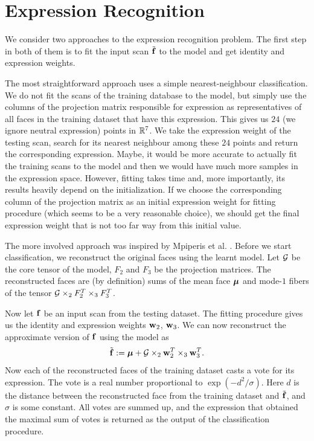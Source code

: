 
\section{Expression Recognition}


We consider two approaches to the expression recognition problem.
The first step in both of them is
to fit the input scan ${\tilde{\mathbf{f}}}$ to the model and get identity 
and expression weights.  

The most straightforward approach uses a simple nearest-neighbour classification.
We do not fit the scans of the training database to the model, but simply use
the columns of the projection matrix responsible for expression as representatives
of all faces in the training dataset that have this expression. This gives us $24$ (we ignore neutral
expression)
points in $\mathbb{R}^7$. We take the expression weight of the testing scan, search for
its nearest neighbour among these $24$ points and return the corresponding expression.
Maybe, it would be more accurate to actually fit the training scans
to the model and then we would have much more samples in the expression space.
However, fitting takes time and, more importantly, its 
results heavily depend on the initialization. If we choose
the corresponding column of the projection matrix
as an initial expression weight for fitting procedure (which 
seems to be a very reasonable choice), we should
get the final expression weight that is not too 
far way from this initial value.


The more involved approach was inspired by Mpiperis et al. \cite{mpip_2008}.
Before we start classification, we reconstruct the original faces using the learnt model.
Let $\mathcal{G}$ be the core tensor of the model, $F_2$ and $F_3$ be the projection matrices. The reconstructed
faces are (by definition) sums of the mean face ${\boldsymbol{\mu}}$ and mode-$1$ fibers of the tensor $\mathcal{G} \times_2 F_2^T \times_3 F_3^T$.

Now let ${\mathbf{f}}$ be an input scan from the testing dataset. The fitting procedure
gives us the identity and expression weights ${\mathbf{w}}_2$, ${\mathbf{w}}_3$. We can now reconstruct
the approximate version of ${\mathbf{f}}$ using the model as
\begin{equation}
{\tilde{\mathbf{f}}} := {\boldsymbol{\mu}} + \mathcal{G} \times_2 {\mathbf{w}}_2^T \times_3 {\mathbf{w}}_3^T.
\end{equation}
Now each of the reconstructed faces of the training dataset casts a vote for its expression.
The vote is a real number proportional to $\exp( - d^2 / \sigma)$. Here $d$ is the
distance between the reconstructed face from the training dataset and ${\tilde{\mathbf{f}}}$,
and $\sigma$ is some constant. All votes are summed up, and the expression
that obtained the maximal sum of votes is returned as the output
of the classification procedure.


